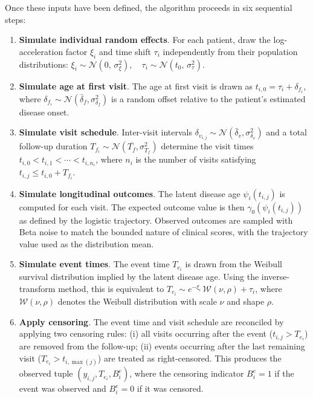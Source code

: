 \documentclass{rapportCS}
\begin{document}
Once these inputs have been defined, the algorithm proceeds in six sequential steps:

\begin{enumerate}
  \item \textbf{Simulate individual random effects}. For each patient, draw the log-acceleration factor $\xi_i$ and time shift $\tau_i$ independently from their population distributions: $\xi_i \sim \mathcal{N}(0,\, \sigma_\xi^2), \quad
  \tau_i \sim \mathcal{N}(t_0,\, \sigma_\tau^2)$.
  \item \textbf{Simulate age at first visit}. The age at first visit is drawn as $t_{i,0} = \tau_i + \delta_{f_i}$, where $\delta_{f_i} \sim \mathcal{N}(\bar{\delta}_f, \sigma_{\delta_f}^2)$ is a random offset relative to the patient's estimated disease onset. 
  \item \textbf{Simulate visit schedule}. Inter-visit intervals $\delta_{v_{i,j}} \sim \mathcal{N}(\bar{\delta}_v, \sigma_{\delta_v}^2)$ and a total follow-up duration $T_{f_i} \sim \mathcal{N}(\overline{T_f}, \sigma_{T_f}^2)$ determine the visit times $t_{i,0} < t_{i,1} < \cdots < t_{i,n_i}$, where $n_i$ is the number of visits satisfying $t_{i,j} \leq t_{i,0} + T_{f_i}$.
  \item \textbf{Simulate longitudinal outcomes}. The latent disease age $\psi_i(t_{i,j})$ is computed for each visit. The expected outcome value is then $\gamma_0(\psi_i(t_{i,j}))$ as defined by the logistic trajectory. Observed outcomes are sampled with Beta noise to match the bounded nature of clinical scores, with the trajectory value used as the distribution mean.
  \item \textbf{Simulate event times}. The event time $T_{e_i}$ is drawn from the Weibull survival distribution implied by the latent disease age. Using the inverse-transform method, this is equivalent to $T_{e_i} \sim e^{-\xi_i}\, \mathcal{W}(\nu, \rho) + \tau_i$, where $\mathcal{W}(\nu, \rho)$ denotes the Weibull distribution with scale $\nu$ and shape $\rho$.
  \item \textbf{Apply censoring}. The event time and visit schedule are reconciled by applying two censoring rules: (i) all visits occurring after the event ($t_{i,j} > T_{e_i}$) are removed from the follow-up; (ii) events occurring after the last remaining visit ($T_{e_i} > t_{i,\max(j)}$) are treated as right-censored. This produces the observed tuple $(y_{i,j}, T_{e_i}, B^e_i)$, where the censoring indicator $B^e_i = 1$ if the event was observed and $B^e_i = 0$ if it was censored.
\end{enumerate}
\end{document}
